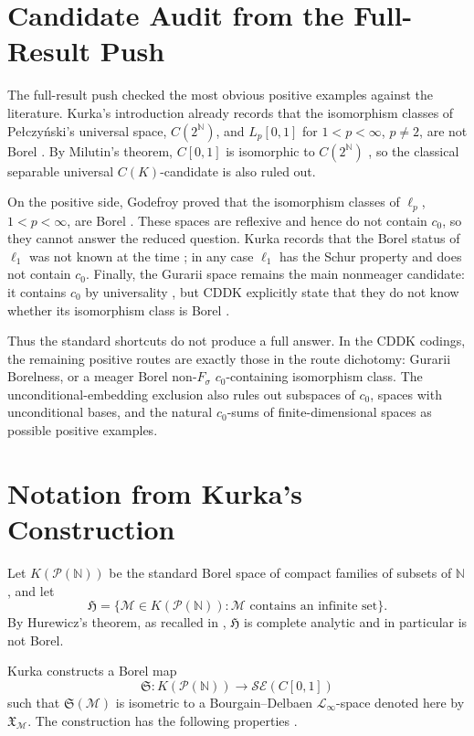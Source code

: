 \documentclass[11pt]{article}
\begin{document}
\section*{Candidate Audit from the Full-Result Push}

The full-result push checked the most obvious positive examples against the
literature.  Kurka's introduction already records that the isomorphism classes
of Pe\l czy\'nski's universal space, \(C(2^{\mathbb N})\), and
\(L_p[0,1]\) for \(1<p<\infty\), \(p\ne2\), are not Borel \cite{Kurka}.  By
Milutin's theorem, \(C[0,1]\) is isomorphic to \(C(2^{\mathbb N})\)
\cite{Milutin}, so the classical separable universal \(C(K)\)-candidate is
also ruled out.

On the positive side, Godefroy proved that the isomorphism classes of
\(\ell_p\), \(1<p<\infty\), are Borel \cite{GodefroyLp}.  These spaces are
reflexive and hence do not contain \(c_0\), so they cannot answer the reduced
question.  Kurka records that the Borel status of \(\ell_1\) was not known at
the time \cite{Kurka}; in any case \(\ell_1\) has the Schur property and does
not contain \(c_0\).  Finally, the Gurarii space remains the main nonmeager
candidate: it contains \(c_0\) by universality \cite{BKK}, but CDDK explicitly
state that they do not know whether its isomorphism class is Borel
\cite[Question 6.2]{CDDK}.

Thus the standard shortcuts do not produce a full answer.  In the CDDK codings,
the remaining positive routes are exactly those in the route dichotomy:
Gurarii Borelness, or a meager Borel non-\(F_\sigma\) \(c_0\)-containing
isomorphism class.  The unconditional-embedding exclusion also rules out
subspaces of \(c_0\), spaces with unconditional bases, and the natural
\(c_0\)-sums of finite-dimensional spaces as possible positive examples.

\section*{Notation from Kurka's Construction}

Let \(K(\mathcal P(\mathbb N))\) be the standard Borel space of compact families of subsets of \(\mathbb N\), and let
\[
  \mathfrak H=\{\mathcal M\in K(\mathcal P(\mathbb N)):\mathcal M
  \text{ contains an infinite set}\}.
\]
By Hurewicz's theorem, as recalled in \cite[Theorem 4.3]{Kurka}, \(\mathfrak H\) is complete analytic and in particular is not Borel.

Kurka constructs a Borel map
\[
  \mathfrak S:K(\mathcal P(\mathbb N))\to \mathcal{SE}(C[0,1])
\]
such that \(\mathfrak S(\mathcal M)\) is isometric to a Bourgain--Delbaen \(\mathcal L_\infty\)-space denoted here by \(\mathfrak X_{\mathcal M}\).  The construction has the following properties \cite[Propositions 3.6 and 3.8, Lemma 4.1, and Theorem 4.3]{Kurka}.
\end{document}

